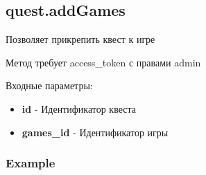 \subsection{quest.addGames}

Позволяет прикрепить квест к игре

Метод требует access\_token с правами admin

Входные параметры:
\begin{itemize}
  \item \textbf{id} - Идентификатор квеста
  \item \textbf{games_id} - Идентификатор игры
\end{itemize}

\subsubsection{Example}
\begin{Verbatim}[frame=single]

\end{Verbatim}